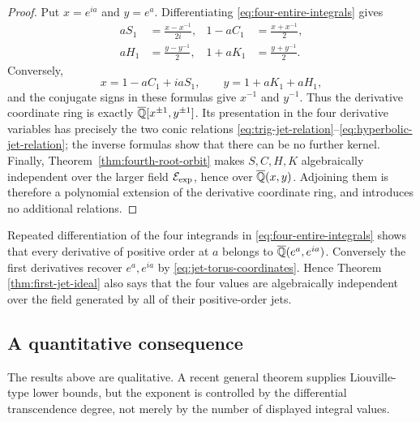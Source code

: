 \begin{proof}
Put \(x=e^{ia}\) and \(y=e^a\).  Differentiating
\eqref{eq:four-entire-integrals} gives
\begin{equation}\label{eq:jet-torus-coordinates}
\begin{aligned}
 aS_1&=\frac{x-x^{-1}}{2i},&
 1-aC_1&=\frac{x+x^{-1}}2,\\
 aH_1&=\frac{y-y^{-1}}2,&
 1+aK_1&=\frac{y+y^{-1}}2.
\end{aligned}
\end{equation}
Conversely,
\[
 x=1-aC_1+iaS_1,\qquad y=1+aK_1+aH_1,
\]
and the conjugate signs in these formulas give \(x^{-1}\) and \(y^{-1}\).
Thus the derivative coordinate ring is exactly
\(\overline{\mathbb Q}[x^{\pm1},y^{\pm1}]\).  Its presentation in the four derivative
variables has precisely the two conic relations
\eqref{eq:trig-jet-relation}--\eqref{eq:hyperbolic-jet-relation}; the
inverse formulas show that there can be no further kernel.  Finally,
Theorem~\ref{thm:fourth-root-orbit} makes \(S,C,H,K\) algebraically
independent over the larger field \(\mathcal E_{\mathrm{exp}}\), hence over
\(\overline{\mathbb Q}(x,y)\).  Adjoining them is therefore a polynomial extension of the
derivative coordinate ring, and introduces no additional relations.
\end{proof}

\begin{remark}
Repeated differentiation of the four integrands in
\eqref{eq:four-entire-integrals} shows that every derivative of positive
order at \(a\) belongs to \(\overline{\mathbb Q}(e^a,e^{ia})\).  Conversely the first
derivatives recover \(e^a,e^{ia}\) by
\eqref{eq:jet-torus-coordinates}.  Hence Theorem
\ref{thm:first-jet-ideal} also says that the four values are algebraically
independent over the field generated by all of their positive-order jets.
\end{remark}

\subsection{A quantitative consequence}

The results above are qualitative.  A recent general theorem supplies
Liouville-type lower bounds, but the exponent is controlled by the
differential transcendence degree, not merely by the number of displayed
integral values.

